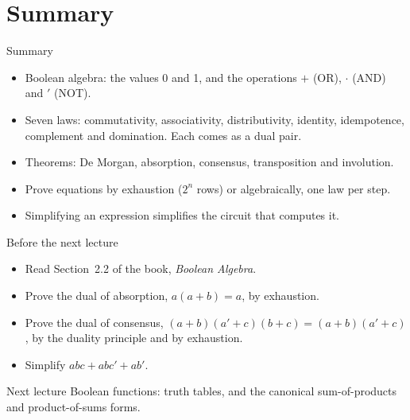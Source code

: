 \documentclass[10pt]{wosm-slides}
\begin{document}
\section{Summary}

\begin{frame}{Summary}
  \begin{itemize}
    \item Boolean algebra: the values 0 and 1, and the operations $+$ (OR),
      $\cdot$ (AND) and $'$ (NOT).
    \item Seven laws: commutativity, associativity, distributivity, identity,
      idempotence, complement and domination. Each comes as a dual pair.
    \item Theorems: De Morgan, absorption, consensus, transposition and involution.
    \item Prove equations by exhaustion ($2^n$ rows) or algebraically, one law per
      step.
    \item Simplifying an expression simplifies the circuit that computes it.
  \end{itemize}
\end{frame}

\begin{frame}{Before the next lecture}
  \begin{itemize}
    \item Read Section~2.2 of the book, \emph{Boolean Algebra}.
    \item Prove the dual of absorption, $a(a + b) = a$, by exhaustion.
    \item Prove the dual of consensus,
      $(a + b)(a' + c)(b + c) = (a + b)(a' + c)$, by the duality principle and by
      exhaustion.
    \item Simplify $abc + abc' + ab'$.
  \end{itemize}

  \begin{block}{Next lecture }
    Boolean functions: truth tables, and the canonical sum-of-products and
    product-of-sums forms.
  \end{block}
\end{frame}
\end{document}
